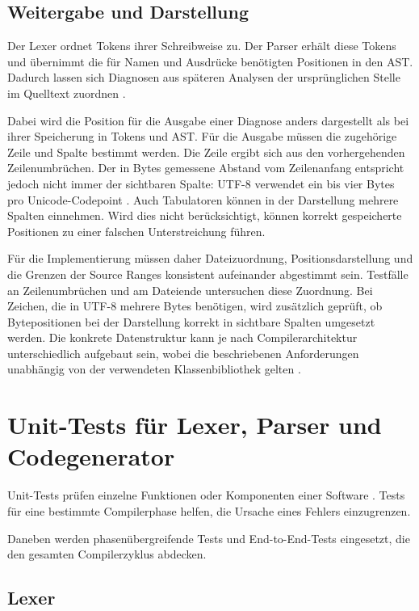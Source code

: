 \documentclass[11pt,a4paper]{article}
\begin{document}
\subsection{Weitergabe und Darstellung}
Der Lexer ordnet Tokens ihrer Schreibweise zu. Der Parser erhält diese Tokens und übernimmt die für Namen und Ausdrücke benötigten Positionen in den AST. Dadurch lassen sich Diagnosen aus späteren Analysen der ursprünglichen Stelle im Quelltext zuordnen \parencite{clang}.

Dabei wird die Position für die Ausgabe einer Diagnose anders dargestellt als bei ihrer Speicherung in Tokens und AST. Für die Ausgabe müssen die zugehörige Zeile und Spalte bestimmt werden. Die Zeile ergibt sich aus den vorhergehenden Zeilenumbrüchen. Der in Bytes gemessene Abstand vom Zeilenanfang entspricht jedoch nicht immer der sichtbaren Spalte: UTF-8 verwendet ein bis vier Bytes pro Unicode-Codepoint \parencite[Abschnitt~3]{utf8}. Auch Tabulatoren können in der Darstellung mehrere Spalten einnehmen. Wird dies nicht berücksichtigt, können korrekt gespeicherte Positionen zu einer falschen Unterstreichung führen.

Für die Implementierung müssen daher Dateizuordnung, Positionsdarstellung und die Grenzen der Source Ranges konsistent aufeinander abgestimmt sein. Testfälle an Zeilenumbrüchen und am Dateiende untersuchen diese Zuordnung. Bei Zeichen, die in UTF-8 mehrere Bytes benötigen, wird zusätzlich geprüft, ob Bytepositionen bei der Darstellung korrekt in sichtbare Spalten umgesetzt werden. Die konkrete Datenstruktur kann je nach Compilerarchitektur unterschiedlich aufgebaut sein, wobei die beschriebenen Anforderungen unabhängig von der verwendeten Klassenbibliothek gelten \parencite{clang,utf8}.

\section{Unit-Tests für Lexer, Parser und Codegenerator}

Unit-Tests prüfen einzelne Funktionen oder Komponenten einer Software \parencite{meszaros2007}. Tests für eine bestimmte Compilerphase helfen, die Ursache eines Fehlers einzugrenzen. 

Daneben werden phasenübergreifende Tests und End-to-End-Tests eingesetzt, die den gesamten Compilerzyklus abdecken.

\subsection{Lexer}
\end{document}
